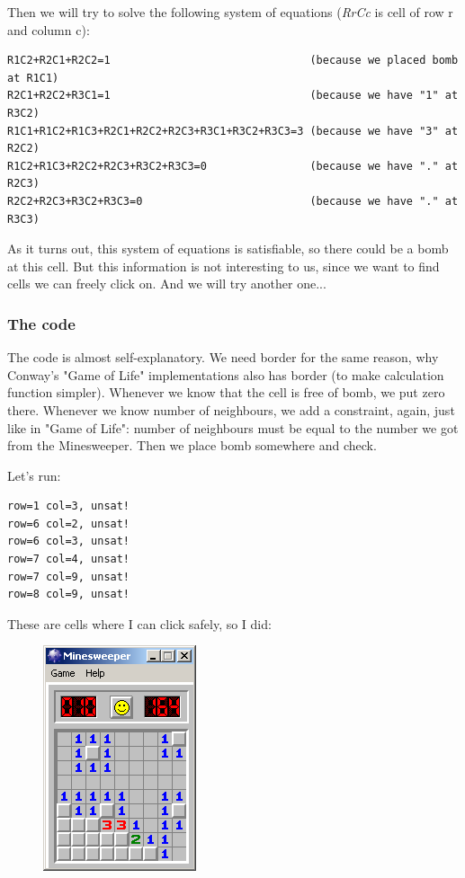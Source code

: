 Then we will try to solve the following system of equations (\textit{RrCc} is cell of row r and column c):

\begin{lstlisting}
R1C2+R2C1+R2C2=1                               (because we placed bomb at R1C1)
R2C1+R2C2+R3C1=1                               (because we have "1" at R3C2)
R1C1+R1C2+R1C3+R2C1+R2C2+R2C3+R3C1+R3C2+R3C3=3 (because we have "3" at R2C2)
R1C2+R1C3+R2C2+R2C3+R3C2+R3C3=0                (because we have "." at R2C3)
R2C2+R2C3+R3C2+R3C3=0                          (because we have "." at R3C3)
\end{lstlisting}

As it turns out, this system of equations is satisfiable, so there could be a bomb at this cell.
But this information is not interesting to us, since we want to find cells we can freely click on.
And we will try another one...

\subsubsection{The code}



The code is almost self-explanatory.
We need border for the same reason, why Conway's "Game of Life" implementations also has border (to make calculation
function simpler).
Whenever we know that the cell is free of bomb, we put zero there.
Whenever we know number of neighbours, we add a constraint, again, just like in "Game of Life": number of neighbours must be equal to the number we got from the Minesweeper.
Then we place bomb somewhere and check.

Let's run:

\begin{lstlisting}
row=1 col=3, unsat!
row=6 col=2, unsat!
row=6 col=3, unsat!
row=7 col=4, unsat!
row=7 col=9, unsat!
row=8 col=9, unsat!
\end{lstlisting}

These are cells where I can click safely, so I did:

\begin{figure}[H]
\centering
\includegraphics[scale=0.75]{SMT/minesweeper/2.png}
\end{figure}

